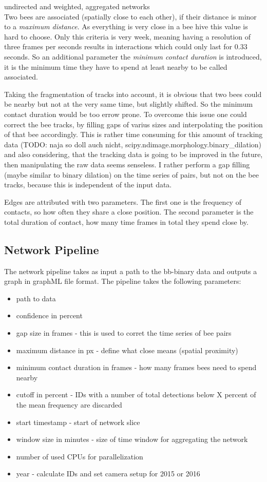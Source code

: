 undirected and weighted, aggregated networks\\

Two bees are associated (spatially close to each other), if their distance is minor to a \emph{maximum distance}. As everything is very close in a bee hive this value is hard to choose. Only this criteria is very week, meaning having a resolution of three frames per seconds results in interactions which could only last for $0.33$ seconds. So an additional parameter the \emph{minimum contact duration} is introduced, it is the minimum time they have to spend at least nearby to be called associated.

Taking the fragmentation of tracks into account, it is obvious that two bees could be nearby but not at the very same time, but slightly shifted. So the minimum contact duration would be too errow prone. To overcome this issue one could correct the bee tracks, by filling gaps of varius sizes and interpolating the position of that bee accordingly. This is rather time consuming for this amount of tracking data (TODO: naja so doll auch nicht, scipy.ndimage.morphology.binary\_dilation) and also considering, that the tracking data is going to be improved in the future, then manipulating the raw data seems senseless. I rather perform a gap filling (maybe similar to binary dilation) on the time series of pairs, but not on the bee tracks, because this is independent of the input data.

Edges are attributed with two parameters. The first one is the frequency of contacts, so how often they share a close position. The second parameter is the total duration of contact, how many time frames in total they spend close by.

\subsection{Network Pipeline}

The network pipeline takes as input a path to the bb-binary data and outputs a graph in graphML file format. The pipeline takes the following parameters:

\begin{itemize}
\item path to data
\item confidence in percent
\item gap size in frames - this is used to corret the time series of bee pairs
\item maximum distance in px - define what close means (spatial proximity)
\item minimum contact duration in frames - how many frames bees need to spend nearby
\item cutoff in percent - IDs with a number of total detections below X percent of the mean frequency are discarded 
\item start timestamp - start of network slice
\item window size in minutes - size of time window for aggregating the network
\item number of used CPUs for parallelization
\item year - calculate IDs and set camera setup for 2015 or 2016
\end{itemize}

